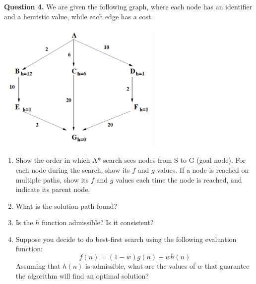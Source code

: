 \documentclass[a4paper,12pt]{article}
\begin{document}
\noindent \textbf{Question 4.} We are given the following graph, where each node has an identifier and a heuristic value, while each edge has a cost.
\begin{center}
\includegraphics[width=8cm]{w6_q4_fig.png}
\end{center}
\begin{enumerate}
    \item Show the order in which A* search sees nodes from S to G (goal node). For each node during the search, show its $f$ and $g$ values. If a node is reached on multiple paths, show its $f$ and $g$ values each time the node is reached, and indicate its parent node.
    \item What is the solution path found?
    \item Is the $h$ function admissible? Is it consistent?
    \item Suppose you decide to do best-first search using the following evaluation function:
    \begin{equation*}
        f(n) = (1 - w) g(n) + w h(n)
    \end{equation*}
    Assuming that $h(n)$ is admissible, what are the values of $w$ that guarantee the algorithm will find an optimal solution?
\end{enumerate}
\end{document}
